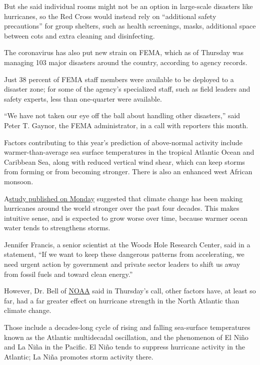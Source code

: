 But she said individual rooms might not be an option in large-scale
disasters like hurricanes, so the Red Cross would instead rely on
``additional safety precautions'' for group shelters, such as health
screenings, masks, additional space between cots and extra cleaning and
disinfecting.

The coronavirus has also put new strain on FEMA, which as of Thursday
was managing 103 major disasters around the country, according to agency
records.

Just 38 percent of FEMA staff members were available to be deployed to a
disaster zone; for some of the agency's specialized staff, such as field
leaders and safety experts, less than one-quarter were available.

``We have not taken our eye off the ball about handling other
disasters,'' said Peter T. Gaynor, the FEMA administrator, in a call
with reporters this month.

Factors contributing to this year's prediction of above-normal activity
include warmer-than-average sea surface temperatures in the tropical
Atlantic Ocean and Caribbean Sea, along with reduced vertical wind
shear, which can keep storms from forming or from becoming stronger.
There is also an enhanced west African monsoon.

A\href{https://www.nytimes3xbfgragh.onion/2020/05/18/climate/climate-changes-hurricane-intensity.html}{study
published on Monday} suggested that climate change has been making
hurricanes around the world stronger over the past four decades. This
makes intuitive sense, and is expected to grow worse over time, because
warmer ocean water tends to strengthens storms.

Jennifer Francis, a senior scientist at the Woods Hole Research Center,
said in a statement, ``If we want to keep these dangerous patterns from
accelerating, we need urgent action by government and private sector
leaders to shift us away from fossil fuels and toward clean energy.''

However, Dr. Bell of
\href{https://www.nytimes3xbfgragh.onion/2020/07/09/climate/trump-hurricane-dorian-noaa.html}{NOAA}
said in Thursday's call, other factors have, at least so far, had a far
greater effect on hurricane strength in the North Atlantic than climate
change.

Those include a decades-long cycle of rising and falling sea-surface
temperatures known as the Atlantic multidecadal oscillation, and the
phenomenon of El Niño and La Niña in the Pacific. El Niño tends to
suppress hurricane activity in the Atlantic; La Niña promotes storm
activity there.

